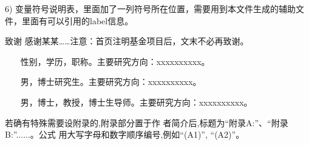 \documentclass[10.5pt,twocolumn]{jbuaa}
\begin{document}
6) 变量符号说明表，里面加了一列符号所在位置，需要用到本文件生成的辅助文件，里面有可以引用的label信息。


\vspace{1em}
{\hei\wuhao 致谢\quad}
{\fang\wuhao 
感谢某某……注意：首页注明基金项目后，文末不必再致谢。
}




\renewcommand\refname{\hei\wuhao\centerline{参考文献（References）}\global\def\refname{参考文献}}
\vskip 12pt

\let\OLDthebibliography\thebibliography
\renewcommand\thebibliography[1]{
  \OLDthebibliography{#1}
  \setlength{\parskip}{0pt}
  \setlength{\itemsep}{0pt plus 0.3ex}
}

{
\renewcommand{\baselinestretch}{0.9}
\liuhao


}



{
\xiaowuhao
{}

~~~ 性别，学历，职称。主要研究方向：xxxxxxxxxx。
\vskip 16pt

~~~ 男，博士研究生。主要研究方向：xxxxxxxxxx。
\vskip 16pt

~~~ 男，博士，教授，博士生导师。主要研究方向：xxxxxxxxxx。
}


\vskip 20pt
 
 
若确有特殊需要设附录的,附录部分置于作
者简介后,标题为“附录A:”、“附录B:”......。公式
用大写字母和数字顺序编号,例如“(A1)”, “(A2)”。




\clearpage
\newpage
\pagestyle{fancy}
\fancyhf{}
\lhead{}
\rhead{}
\lfoot{}
\cfoot{}
\rfoot{}
\renewcommand{\headrule}{%
\hrule height0.4pt width \headwidth \vskip1.0pt%
\hrule height0.4pt width \headwidth \vskip-2pt}
\end{document}
